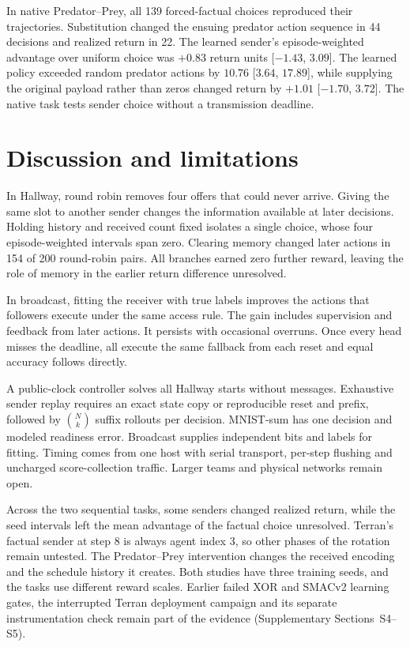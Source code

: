 \documentclass[pdflatex,sn-mathphys-num]{sn-jnl}
\begin{document}
In native Predator--Prey, all 139 forced-factual choices reproduced their trajectories. Substitution changed the ensuing predator action sequence in 44 decisions and realized return in 22. The learned sender's episode-weighted advantage over uniform choice was $+0.83$ return units [$-1.43$, $3.09$]. The learned policy exceeded random predator actions by $10.76$ [$3.64$, $17.89$], while supplying the original payload rather than zeros changed return by $+1.01$ [$-1.70$, $3.72$]. The native task tests sender choice without a transmission deadline.

\section{Discussion and limitations}\label{sec:discussion}
In Hallway, round robin removes four offers that could never arrive. Giving the same slot to another sender changes the information available at later decisions. Holding history and received count fixed isolates a single choice, whose four episode-weighted intervals span zero. Clearing memory changed later actions in 154 of 200 round-robin pairs. All branches earned zero further reward, leaving the role of memory in the earlier return difference unresolved.

In broadcast, fitting the receiver with true labels improves the actions that followers execute under the same access rule. The gain includes supervision and feedback from later actions. It persists with occasional overruns. Once every head misses the deadline, all execute the same fallback from each reset and equal accuracy follows directly.

A public-clock controller solves all Hallway starts without messages. Exhaustive sender replay requires an exact state copy or reproducible reset and prefix, followed by $\binom Nk$ suffix rollouts per decision. MNIST-sum has one decision and modeled readiness error. Broadcast supplies independent bits and labels for fitting. Timing comes from one host with serial transport, per-step flushing and uncharged score-collection traffic. Larger teams and physical networks remain open.

Across the two sequential tasks, some senders changed realized return, while the seed intervals left the mean advantage of the factual choice unresolved. Terran's factual sender at step 8 is always agent index 3, so other phases of the rotation remain untested. The Predator--Prey intervention changes the received encoding and the schedule history it creates. Both studies have three training seeds, and the tasks use different reward scales. Earlier failed XOR and SMACv2 learning gates, the interrupted Terran deployment campaign and its separate instrumentation check remain part of the evidence (Supplementary Sections~S4--S5).
\end{document}
